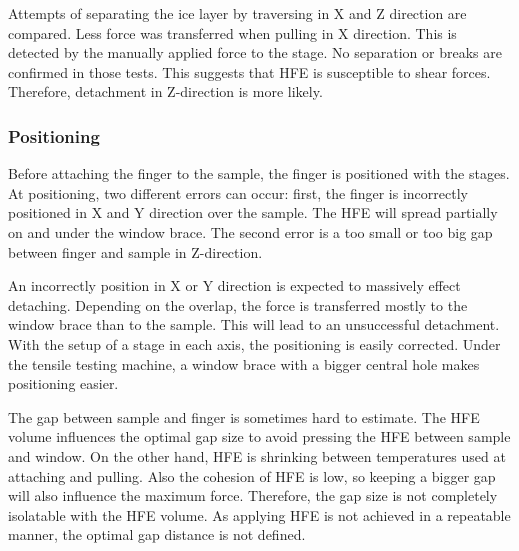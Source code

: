 Attempts of separating the ice layer by traversing in X and Z direction are compared. Less force was transferred when pulling in X direction. This is detected by the manually applied force to the stage. No separation or breaks are confirmed in those tests. This suggests that HFE is susceptible to shear forces. Therefore, detachment in Z-direction is more likely. 

\subsubsection{Positioning}

Before attaching the finger to the sample, the finger is positioned with the stages. At positioning, two different errors can occur: first, the finger is incorrectly positioned in X and Y direction over the sample. The HFE will spread partially on and under the window brace. The second error is a too small or too big gap between finger and sample in Z-direction. 

An incorrectly position in X or Y direction is expected to massively effect detaching. Depending on the overlap, the force is transferred mostly to the window brace than to the sample. This will lead to an unsuccessful detachment. With the setup of a stage in each axis, the positioning is easily corrected. Under the tensile testing machine, a window brace with a bigger central hole makes positioning easier.

The gap between sample and finger is sometimes hard to estimate. The HFE volume influences the optimal gap size to avoid pressing the HFE between sample and window. On the other hand, HFE is shrinking between temperatures used at attaching and pulling. Also the cohesion of HFE is low, so keeping a bigger gap will also influence the maximum force. Therefore, the gap size is not completely isolatable with the HFE volume. As applying HFE is not achieved in a repeatable manner, the optimal gap distance is not defined.


